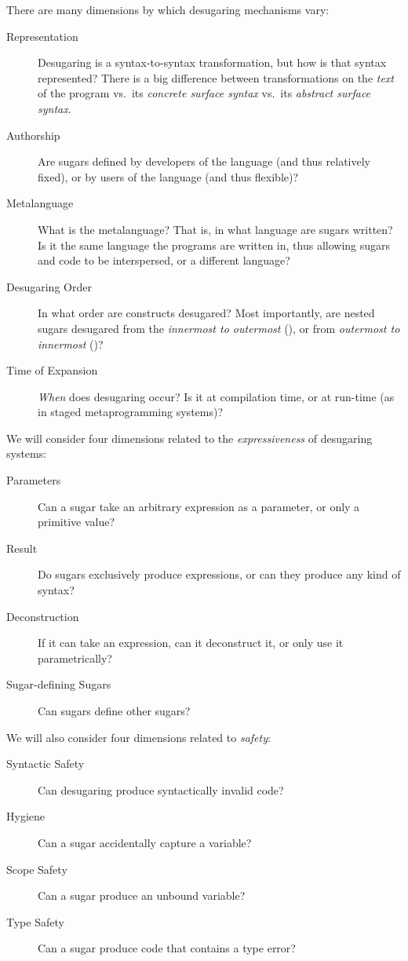 There are many dimensions by which desugaring mechanisms vary:
\begin{description}
  \item[Representation] Desugaring is a syntax-to-syntax transformation, but
    how is that syntax represented? There is a big difference between
    transformations on the \emph{text} of the program vs.\ its
    \emph{concrete surface syntax} vs.\ its \emph{abstract surface
      syntax}.
  \item[Authorship] Are sugars defined by developers of the language (and thus
    relatively fixed), or by users of the language (and thus flexible)?
  \item[Metalanguage] What is the metalanguage? That is, in what language are sugars
    written? Is it the same language the programs are written in, thus
    allowing sugars and code to be interspersed, or a different
    language?
  \item[Desugaring Order] In what order are constructs desugared? Most
    importantly, are nested sugars desugared from the \emph{innermost
      to outermost} (), or from \emph{outermost to innermost}
    ()?
  \item[Time of Expansion] \emph{When} does desugaring occur? Is it at compilation time,
    or at run-time (as in staged metaprogramming
    systems)?
\end{description}
We will consider four dimensions related to the \emph{expressiveness}
of desugaring systems:
\begin{description}
  \item[Parameters] Can a sugar take an
    arbitrary expression as a parameter, or only a primitive value?
  \item[Result] Do sugars exclusively produce expressions, or can they
    produce any kind of syntax?
  \item[Deconstruction] If it can take an expression, can it
    deconstruct it, or only use it parametrically?
  \item[Sugar-defining Sugars] Can sugars define other sugars?
\end{description}
We will also consider four dimensions related to \emph{safety}:
\begin{description}
  \item[Syntactic Safety] Can desugaring produce syntactically invalid
    code?
  \item[Hygiene] Can a sugar accidentally capture a variable?
  \item[Scope Safety] Can a sugar produce an unbound variable?
  \item[Type Safety] Can a sugar produce code that contains a type
    error?
\end{description}

